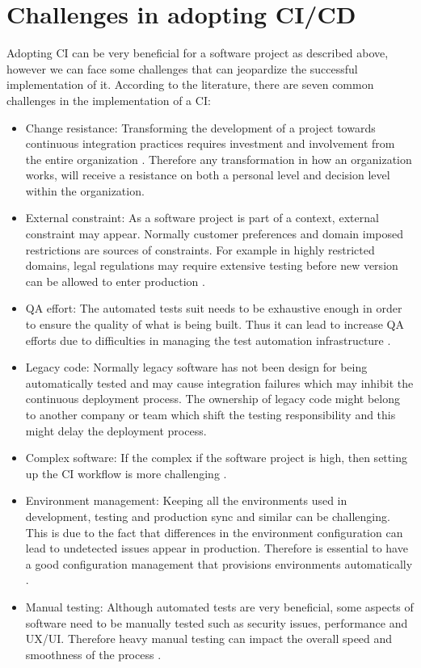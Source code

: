 \section{Challenges in adopting CI/CD}
\label{ci-challenges}

Adopting CI can be very beneficial for a software project as described above, however we can face some challenges that can jeopardize the successful implementation of it. According to the literature, there are seven common challenges in the implementation of a CI:

\begin{itemize}
\item Change resistance: Transforming the development of a project towards continuous integration practices requires investment and involvement from the entire organization \citep{Rodriguez2016}. Therefore any transformation in how an organization works, will receive a resistance on both a personal level and decision level within the organization.
\item External constraint: As a software project is part of a context, external constraint may appear. Normally customer preferences and domain imposed restrictions are sources of constraints. For example in highly restricted domains, legal regulations may require extensive testing before new version can be allowed to enter production \citep{Rodriguez2016}.
\item QA effort: The automated tests suit needs to be exhaustive enough in order to ensure the quality of what is being built. Thus it can lead to increase QA efforts due to difficulties in managing the test automation infrastructure \citep{Rodriguez2016}.
\item Legacy code: Normally legacy software has not been design for being automatically tested and may cause integration failures which may inhibit the continuous deployment process. The ownership of legacy code might belong to another company or team which shift the testing responsibility and this might delay the deployment process.
\item Complex software: If the complex if the software project is high, then setting up the CI workflow is more challenging \citep{Leppanen2015}.
\item Environment management: Keeping all the environments used in development, testing and production sync and similar can be challenging. This is due to the fact that differences in the environment configuration can lead to undetected issues appear in production. Therefore is essential to have a good configuration management that provisions environments automatically \citep{Leppanen2015}.
\item Manual testing: Although automated tests are very beneficial, some aspects of software need to be manually tested such as security issues, performance and UX/UI. Therefore 	heavy manual testing can impact the overall speed and smoothness of the process \citep{Leppanen2015}.
\end{itemize}

